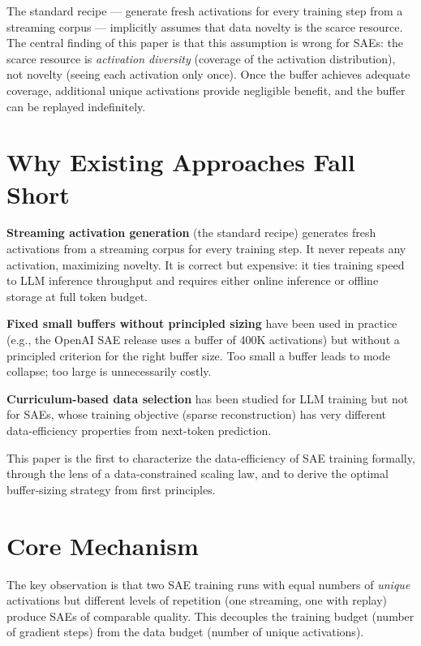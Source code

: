 \documentclass[10pt,twocolumn]{article}
\begin{document}
The standard recipe --- generate fresh activations for every training step from
a streaming corpus --- implicitly assumes that data novelty is the scarce
resource. The central finding of this paper is that this assumption is wrong for
SAEs: the scarce resource is \emph{activation diversity} (coverage of the
activation distribution), not novelty (seeing each activation only once).
Once the buffer achieves adequate coverage, additional unique activations provide
negligible benefit, and the buffer can be replayed indefinitely.

\section{Why Existing Approaches Fall Short}

\textbf{Streaming activation generation} (the standard recipe) generates fresh
activations from a streaming corpus for every training step. It never repeats
any activation, maximizing novelty. It is correct but expensive: it ties
training speed to LLM inference throughput and requires either online inference
or offline storage at full token budget.

\textbf{Fixed small buffers without principled sizing} have been used in practice
(e.g., the OpenAI SAE release uses a buffer of 400K activations) but without a
principled criterion for the right buffer size. Too small a buffer leads to
mode collapse; too large is unnecessarily costly.

\textbf{Curriculum-based data selection} has been studied for LLM training but
not for SAEs, whose training objective (sparse reconstruction) has very different
data-efficiency properties from next-token prediction.

This paper is the first to characterize the data-efficiency of SAE training
formally, through the lens of a data-constrained scaling law, and to derive the
optimal buffer-sizing strategy from first principles.

\section{Core Mechanism}

The key observation is that two SAE training runs with equal numbers of
\emph{unique} activations but different levels of repetition (one streaming,
one with replay) produce SAEs of comparable quality. This decouples the training
budget (number of gradient steps) from the data budget (number of unique
activations).
\end{document}
